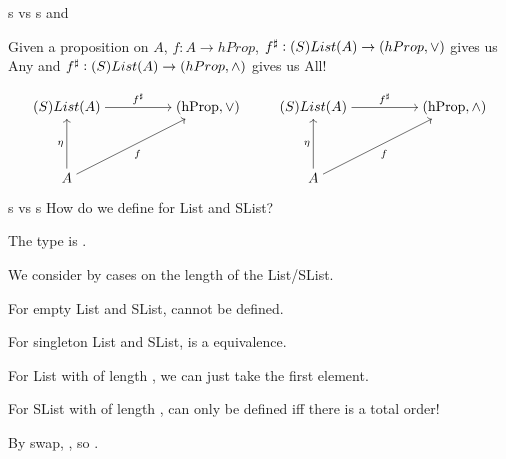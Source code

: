 \documentclass[9pt]{beamer}
\begin{document}
\begin{frame}{s vs s}
     and 

    Given a \alert{proposition} on $A$, $f : A \to hProp$,
    ${f}^{\sharp} : (S)List(A) \to (hProp, \vee)$ gives us Any and 
    ${f}^{\sharp} : (S)List(A) \to (hProp, \wedge)$ gives us All!
   
\vspace{1cm}

\[
\begin{tikzcd}[ampersand replacement=\&,cramped]
	{(S)List(A)} \&\& {(\text{hProp}, \vee)} \\
	\\
	A
	\arrow["\eta", from=3-1, to=1-1]
	\arrow["{\ext{f}}", from=1-1, to=1-3]
	\arrow["{f}"', from=3-1, to=1-3]
\end{tikzcd}
\hspace{1cm}
\begin{tikzcd}[ampersand replacement=\&,cramped]
	{(S)List(A)} \&\& {(\text{hProp}, \wedge)} \\
	\\
	A
	\arrow["\eta", from=3-1, to=1-1]
	\arrow["{\ext{f}}", from=1-1, to=1-3]
	\arrow["{f}"', from=3-1, to=1-3]
\end{tikzcd}
\]


\end{frame}


\begin{frame}[fragile]{s vs s}
How do we define  for List and SList?

The type is .

We consider by cases on the length of the List/SList.

For \alert{empty} List and SList,  cannot be defined.

For \alert{singleton} List and SList,  is a equivalence.

For List with \alert{of length }, we can just take the first element.

For SList with \alert{of length },  can only be defined iff there is a \alert{total order}!

By swap, , so .    
\end{frame}
\end{document}
